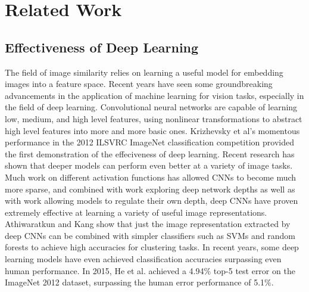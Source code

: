
\section{Related Work}

\subsection{Effectiveness of Deep Learning}
The field of image similarity relies on learning a useful model for embedding images into a feature space. Recent years have seen some groundbreaking advancements in the application of machine learning for vision tasks, especially in the field of deep learning. Convolutional neural networks\cite{lecun1989backpropagation} are capable of learning low, medium, and high level features, using nonlinear transformations to abstract high level features into more and more basic ones. Krizhevsky et al's momentous performance in the 2012 ILSVRC ImageNet classification competition provided the first demonstration of the effeciveness of deep learning.\cite{krizhevsky2012imagenet} Recent research has shown that deeper models can perform even better at a variety of image tasks.\cite{szegedy2015going} Much work on different activation functions has allowed CNNs to become much more sparse, and combined with work exploring deep network depths\cite{simonyan2014very}\cite{szegedy2015going} as well as with work allowing models to regulate their own depth\cite{he2016deep}, deep CNNs have proven extremely effective at learning a variety of useful image representations. Athiwaratkun and Kang show that just the image representation extracted by deep CNNs can be combined with simpler classifiers such as SVMs and random forests to achieve high accuracies for clustering tasks.\cite{athiwaratkun2015feature} In recent years, some deep learning models have even achieved classification accuracies surpassing even human performance. In 2015, He et al. achieved a 4.94\% top-5 test error on the ImageNet 2012 dataset, surpassing the human error performance of 5.1\%\cite{he2016deep}.

